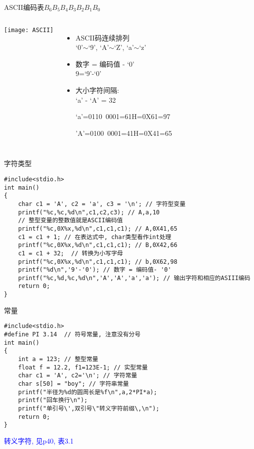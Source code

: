 \note{
	\begin{lstlisting}
	printf("%d,%x,%X\n",-25,-25,-25); // -25,ffffffe7,FFFFFFE7
	printf("%d,%x,%X\n",-77,-77,-77); // -77,ffffffb3,FFFFFFB3}
	\end{lstlisting}
}

\begin{frame}{ASCII编码表$B_6B_5B_4B_3B_2B_1B_0$}
\begin{columns}
	\texttt{[image: ASCII]}
	\begin{itemize}
		\item ASCII码连续排列 \\
		`0'$\sim$`9', `A'$\sim$`Z', `a'$\sim$`z'
		\item 数字 = 编码值 - `0' \\
		9=`9'-`0'
		\item 大小字符间隔: \\
		`a' - `A' = 32
		
		\scriptsize{
			`a'=0110~0001=61H=0X61=97
			
			'A'=0100~0001=41H=0X41=65}
	\end{itemize}	
\end{columns}
\end{frame}

\begin{frame}{字符类型}
\begin{lstlisting}
#include<stdio.h>           
int main()                   
{                            
	char c1 = 'A', c2 = 'a', c3 = '\n'; // 字符型变量
	printf("%c,%c,%d\n",c1,c2,c3); // A,a,10
	// 整型变量的整数值就是ASCII编码值
	printf("%c,0X%x,%d\n",c1,c1,c1); // A,0X41,65
	c1 = c1 + 1; // 在表达式中, char类型看作int处理
	printf("%c,0X%x,%d\n",c1,c1,c1); // B,0X42,66
	c1 = c1 + 32;  // 转换为小写字母
	printf("%c,0X%x,%d\n",c1,c1,c1); // b,0X62,98
	printf("%d\n",'9'-'0'); // 数字 = 编码值- '0'
	printf("%c,%d,%c,%d\n",'A','A','a','a'); // 输出字符和相应的ASIII编码
	return 0;           
}                            
\end{lstlisting}
\end{frame}


\begin{frame}{常量}
\vspace{-0.2cm}
\begin{lstlisting}
#include<stdio.h> 
#define PI 3.14  // 符号常量, 注意没有分号           
int main()                   
{                                  
	int a = 123; // 整型常量
	float f = 12.2, f1=123E-1; // 实型常量
	char c1 = 'A', c2='\n'; // 字符常量
	char s[50] = "boy"; // 字符串常量
	printf("半径为%d的圆周长是%f\n",a,2*PI*a);       
	printf("回车换行\n");
	printf("单引号\',双引号\"转义字符前缀\,\n");  
	return 0;           
}                            
\end{lstlisting}
\textcolor{blue}{转义字符, 见p40, 表3.1}
\end{frame}

